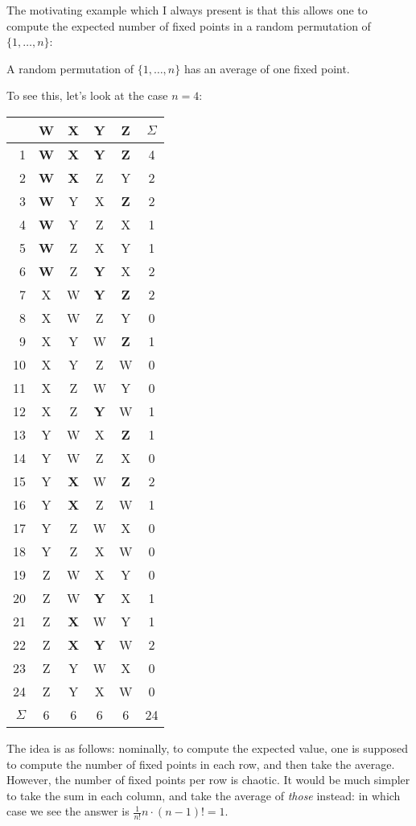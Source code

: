\documentclass[11pt]{scrartcl}
\begin{document}
The motivating example which I always present is that this allows
one to compute the expected number of fixed points in a random
permutation of $\{1, \dots, n\}$:
\begin{example}
	A random permutation of $\{1, \dots, n\}$ has an average of one fixed point.
\end{example}
To see this, let's look at the case $n=4$:
\begin{center}
\begin{tabular}[h]{r|cccc|c}
	& W & X & Y & Z & $\Sigma$ \\ \hline\hline
1 & \textbf{\color{red} W} & \textbf{\color{red} X} & \textbf{\color{red} Y} & \textbf{\color{red} Z} & 4 \\
2 & \textbf{\color{red} W} & \textbf{\color{red} X} & Z & Y & 2 \\
3 & \textbf{\color{red} W} & Y & X & \textbf{\color{red} Z} & 2 \\
4 & \textbf{\color{red} W} & Y & Z & X & 1 \\
5 & \textbf{\color{red} W} & Z & X & Y & 1 \\
6 & \textbf{\color{red} W} & Z & \textbf{\color{red} Y} & X & 2 \\
7 & X & W & \textbf{\color{red} Y} & \textbf{\color{red} Z} & 2 \\
8 & X & W & Z & Y & 0 \\
9 & X & Y & W & \textbf{\color{red} Z} & 1 \\
10 & X & Y & Z & W & 0 \\
11 & X & Z & W & Y & 0 \\
12 & X & Z & \textbf{\color{red} Y} & W & 1 \\
13 & Y & W & X & \textbf{\color{red} Z} & 1 \\
14 & Y & W & Z & X & 0 \\
15 & Y & \textbf{\color{red} X} & W & \textbf{\color{red} Z} & 2 \\
16 & Y & \textbf{\color{red} X} & Z & W & 1 \\
17 & Y & Z & W & X & 0 \\
18 & Y & Z & X & W & 0 \\
19 & Z & W & X & Y & 0 \\
20 & Z & W & \textbf{\color{red} Y} & X & 1 \\
21 & Z & \textbf{\color{red} X} & W & Y & 1 \\
22 & Z & \textbf{\color{red} X} & \textbf{\color{red} Y} & W & 2 \\
23 & Z & Y & W & X & 0 \\
24 & Z & Y & X & W & 0 \\
\hline
$\Sigma$ & 6 & 6 & 6 & 6 & 24
\end{tabular}
\end{center}
The idea is as follows:
nominally, to compute the expected value, one is supposed
to compute the number of fixed points in each row,
and then take the average.
However, the number of fixed points per row is chaotic.
It would be much simpler to take the sum in each column,
and take the average of \emph{those} instead:
in which case we see the answer is $\frac{1}{n!} n \cdot (n-1)! = 1$.
\end{document}
